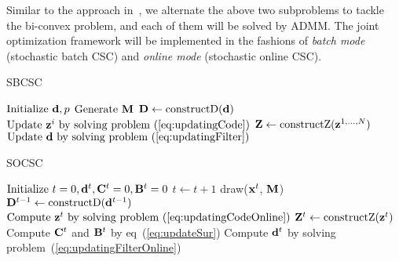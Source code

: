 Similar to the approach in~\cite{heide2015fast}, we alternate the above two subproblems to tackle the bi-convex problem, and each of them will be solved by ADMM. The joint optimization framework will be implemented in the fashions of {\em batch mode} (stochastic batch CSC) and {\em online mode} (stochastic online CSC).

\begin{minipage}[t]{0.5\textwidth}
\vspace{0pt}
\begin{algorithm}[H]
\caption{SBCSC} \label{algo:SBCSC}
\begin{algorithmic}[1]
\State $\text{Initialize} ~ \filter, p$
    \State $ \text{Generate } \mask $
    \State $\Filter \gets \text{constructD}(\filter)$
        \State $ \text{Update } \code^i \text{ by solving problem~(\ref{eq:updatingCode}})$
    \EndFor
    \State $\Code \gets \text{constructZ}(\code^{1,\dots,N})$
    \State $\text{Update } \filter \text{ by solving problem~(\ref{eq:updatingFilter}})$
\EndWhile
\end{algorithmic}
\end{algorithm}
\end{minipage}
\begin{minipage}[t]{0.5\textwidth}
\vspace{0pt}
\begin{algorithm}[H]
\caption{SOCSC} \label{algo:SOCSC}
\begin{algorithmic}[1]
\State $\text{Initialize} ~ t=0, \filter^t,  \surC^t = 0, \surB^t = 0$
    \State $t \gets t+1$
    \State draw($\signal^t$, $\mask$)
    \State $\Filter^{t-1} \gets \text{constructD}(\filter^{t-1})$
    \State $ \text{Compute } \code^t \text{ by solving problem~(\ref{eq:updatingCodeOnline})}$
    \State $\Code^t \gets \text{constructZ}(\code^t)$
    \State Compute $\surC^t$ and $\surB^t$ by eq~(\ref{eq:updateSur})
    \State Compute $\filter^t$ by solving problem~(\ref{eq:updatingFilterOnline})
\EndWhile
\end{algorithmic}
\end{algorithm}
\end{minipage}

